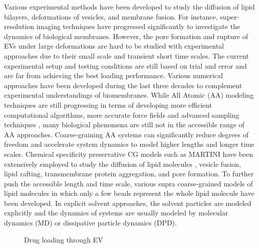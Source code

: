 Various experimental methods have been developed to study the diffusion of lipid bilayers\cite{a14}, deformations of vesicles\cite{a15,a16}, and membrane fusion\cite{a17}. For instance, super-resolution imaging techniques have progressed significantly to investigate the dynamics of biological membranes\cite{a18,a19}. However, the pore formation and rupture of EVs under large deformations are hard to be studied with experimental approaches due to their small scale and transient short time scales. The current experimental setup and testing conditions are still based on trial and error and are far from achieving the best loading performance. Various numerical approaches have been developed during the last three decades to complement experimental understandings of biomembranes. While All Atomic (AA) modeling techniques are still progressing in terms of developing more efficient computational algorithms, more accurate force fields and advanced sampling techniques \cite{a20,a21,a22,a23,a24}, many biological phenomena are still not in the accessible range of AA approaches. Coarse-graining AA systems can significantly reduce degrees of freedom and accelerate system dynamics to model higher lengths and longer time scales. Chemical specificity preservative CG models such as MARTINI have been extensively employed to study the diffusion of lipid molecules \cite{a25}, vesicle fusion, lipid rafting\cite{a26,a27}, transmembrane protein aggregation\cite{a28,a29}, and pore formation\cite{a30}. To further push the accessible length and time scale, various supra coarse-grained models of lipid molecules in which only a few beads represent the whole lipid molecule have been developed\cite{a31,a32,a33,a34,a35,a36}. In explicit solvent approaches, the solvent particles are modeled explicitly and the dynamics of systems are usually modeled by molecular dynamics (MD) or dissipative particle dynamics (DPD)\cite{a37}. 

\begin{figure}[htbp]
  \centering
  
  \caption{ Drug loading through EV}
  \vspace{0.5cm}
  \label{fig:1}
\end{figure}

